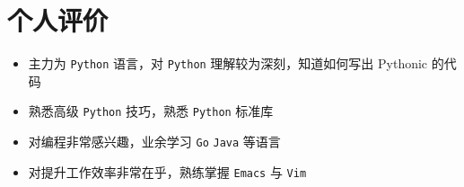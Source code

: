 \documentclass[11pt]{article}
\begin{document}
\section{个人评价}
\label{sec:orgbb40a23}
\begin{itemize}
\item 主力为 \texttt{Python} 语言，对 \texttt{Python} 理解较为深刻，知道如何写出 Pythonic 的代码
\item 熟悉高级 \texttt{Python} 技巧，熟悉 \texttt{Python} 标准库
\item 对编程非常感兴趣，业余学习 \texttt{Go} \texttt{Java} 等语言
\item 对提升工作效率非常在乎，熟练掌握 \texttt{Emacs} 与 \texttt{Vim}
\end{itemize}
\end{document}
